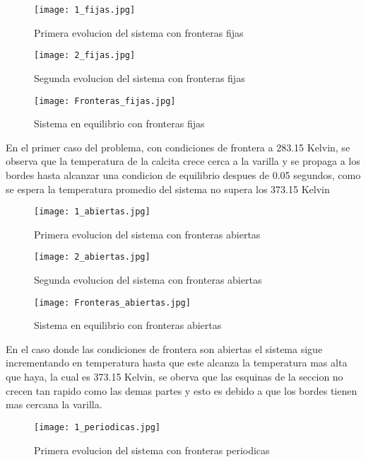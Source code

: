 \documentclass[12pt]{article}
\begin{document}
\newpage
\begin{figure}[h!]
    \centering
    \texttt{[image: 1\_fijas.jpg]}
    \caption{Primera evolucion del sistema con fronteras fijas}
    \label{fig4}
\end{figure}


\begin{figure}[h!]
    \centering
    \texttt{[image: 2\_fijas.jpg]}
    \caption{Segunda evolucion del sistema con fronteras fijas}
    \label{fig5}
\end{figure}

\newpage
\begin{figure}[h!]
    \centering
    \texttt{[image: Fronteras\_fijas.jpg]}
    \caption{Sistema en equilibrio con fronteras fijas}
    \label{fig12}
\end{figure}

En el primer caso del problema, con condiciones de frontera a 283.15 Kelvin, se observa que la temperatura de la calcita crece cerca a la varilla y se propaga a los bordes hasta alcanzar una condicion de equilibrio despues de 0.05 segundos, como se espera la temperatura promedio del sistema no supera los 373.15 Kelvin


\newpage
\begin{figure}[h!]
    \centering
    \texttt{[image: 1\_abiertas.jpg]}
    \caption{Primera evolucion del sistema con fronteras abiertas}
    \label{fig6}
\end{figure}


\begin{figure}[h!]
    \centering
    \texttt{[image: 2\_abiertas.jpg]}
    \caption{Segunda evolucion del sistema con fronteras abiertas}
    \label{fig7}
\end{figure}

\newpage
\begin{figure}[h!]
    \centering
    \texttt{[image: Fronteras\_abiertas.jpg]}
    \caption{Sistema en equilibrio con fronteras abiertas}
    \label{fig8}
\end{figure}

En el caso donde las condiciones de frontera son abiertas el sistema sigue incrementando en temperatura hasta que este alcanza la temperatura mas alta que haya, la cual es 373.15 Kelvin, se oberva que las esquinas de la seccion no crecen tan rapido como las demas partes y esto es debido a que los bordes tienen mas cercana la varilla.


\newpage
\begin{figure}[h!]
    \centering
    \texttt{[image: 1\_periodicas.jpg]}
    \caption{Primera evolucion del sistema con fronteras periodicas}
    \label{fig9}
\end{figure}
\end{document}
